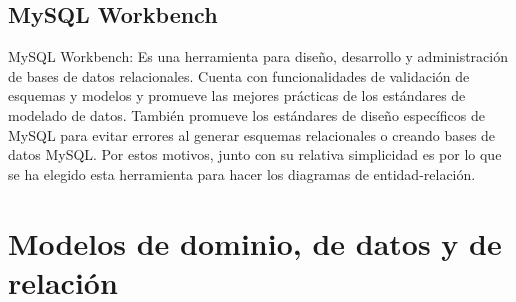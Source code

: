 \documentclass[11pt]{book}
\begin{document}
\section{MySQL Workbench}
MySQL Workbench: Es una herramienta para diseño, desarrollo y administración de bases de datos relacionales. 
Cuenta con funcionalidades de validación de esquemas y modelos y promueve las mejores prácticas de los estándares de modelado de datos. También promueve los estándares de diseño específicos de MySQL para evitar errores al generar esquemas relacionales o creando bases de datos MySQL. Por estos motivos, junto con su relativa simplicidad es por lo que se ha elegido esta herramienta para hacer los diagramas de entidad-relación.

\chapter{Modelos de dominio, de datos y de relación}\label{cap:modelos}
\end{document}
